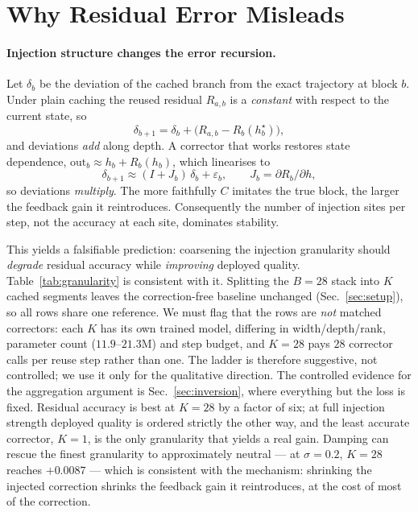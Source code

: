 
\section{Why Residual Error Misleads}
\label{sec:mechanism}

\paragraph{Injection structure changes the error recursion.}
Let $\delta_b$ be the deviation of the cached branch from the exact trajectory at
block $b$. Under plain caching the reused residual $R_{a,b}$ is a \emph{constant}
with respect to the current state, so
\begin{equation}
\delta_{b+1} = \delta_b + \big(R_{a,b} - R_b(h^\star_b)\big),
\label{eq:additive}
\end{equation}
and deviations \emph{add} along depth. A corrector that works restores state
dependence, $\mathrm{out}_b \approx h_b + R_b(h_b)$, which linearises to
\begin{equation}
\delta_{b+1} \approx (I + J_b)\,\delta_b + \varepsilon_b,
\qquad J_b = \partial R_b / \partial h,
\label{eq:multiplicative}
\end{equation}
so deviations \emph{multiply}. The more faithfully $C$ imitates the true block, the
larger the feedback gain it reintroduces. Consequently the number of injection sites
per step, not the accuracy at each site, dominates stability.

This yields a falsifiable prediction: coarsening the injection granularity should
\emph{degrade} residual accuracy while \emph{improving} deployed quality.
Table~\ref{tab:granularity} is consistent with it. Splitting the $B{=}28$ stack into
$K$ cached segments leaves the correction-free baseline unchanged
(Sec.~\ref{sec:setup}), so all rows share one reference. We must flag that the rows
are \emph{not} matched correctors: each $K$ has its own trained model, differing in
width/depth/rank, parameter count ($11.9$--$21.3$M) and step budget, and $K{=}28$ pays
$28$ corrector calls per reuse step rather than one. The ladder is therefore
suggestive, not controlled; we use it only for the qualitative direction. The
controlled evidence for the aggregation argument is Sec.~\ref{sec:inversion}, where
everything but the loss is fixed.
Residual accuracy is best at $K{=}28$ by a factor of six; at full injection strength
deployed quality is ordered strictly the other way, and the least accurate corrector,
$K{=}1$, is the only granularity that yields a real gain. Damping can rescue the
finest granularity to approximately neutral --- at $\sigma{=}0.2$, $K{=}28$ reaches
$+0.0087$ --- which is consistent with the mechanism: shrinking the injected
correction shrinks the feedback gain it reintroduces, at the cost of most of the
correction.

